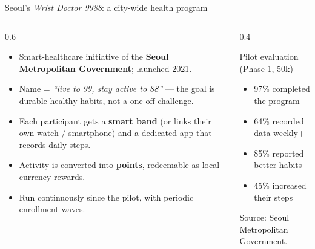\documentclass[10pt,aspectratio=169]{beamer}
\newcommand{\src}[1]{{\color{graytx}\scriptsize Source: #1}}
\begin{document}
\begin{frame}{Seoul's \textit{Wrist Doctor 9988}: a city-wide health program}
  \begin{columns}[T]
    \begin{column}{0.6\textwidth}
      \begin{itemize}
        \item Smart-healthcare initiative of the \textbf{Seoul Metropolitan Government}; launched 2021.
        \item Name = \emph{``live to 99, stay active to 88''} --- the goal is durable healthy habits, not a one-off challenge.
        \item Each participant gets a \textbf{smart band} (or links their own watch / smartphone) and a dedicated app that records daily steps.
        \item Activity is converted into \textbf{points}, redeemable as local-currency rewards.
        \item Run continuously since the pilot, with periodic enrollment waves.
      \end{itemize}
    \end{column}
    \begin{column}{0.4\textwidth}
      \begin{block}{Pilot evaluation (Phase 1, 50k)}
        \begin{itemize}
          \item 97\% completed the program
          \item 64\% recorded data weekly+
          \item 85\% reported better habits
          \item 45\% increased their steps
        \end{itemize}
      \end{block}
      \src{Seoul Metropolitan Government.}
    \end{column}
  \end{columns}
\end{frame}
\end{document}
